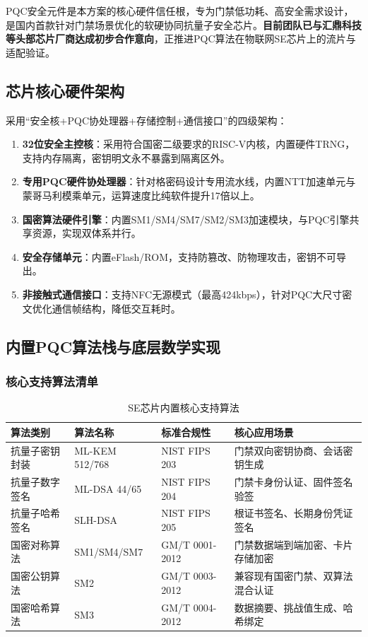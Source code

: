 PQC安全元件是本方案的核心硬件信任根，专为门禁低功耗、高安全需求设计，是国内首款针对门禁场景优化的软硬协同抗量子安全芯片。\textbf{目前团队已与汇鼎科技等头部芯片厂商达成初步合作意向}，正推进PQC算法在物联网SE芯片上的流片与适配验证。

\subsection{芯片核心硬件架构}

采用“安全核+PQC协处理器+存储控制+通信接口”的四级架构：
\begin{enumerate}
	\item \textbf{32位安全主控核}：采用符合国密二级要求的RISC-V内核，内置硬件TRNG，支持内存隔离，密钥明文永不暴露到隔离区外。
	\item \textbf{专用PQC硬件协处理器}：针对格密码设计专用流水线，内置NTT加速单元与蒙哥马利模乘单元，运算速度比纯软件提升17倍以上。
	\item \textbf{国密算法硬件引擎}：内置SM1/SM4/SM7/SM2/SM3加速模块，与PQC引擎共享资源，实现双体系并行。
	\item \textbf{安全存储单元}：内置eFlash/ROM，支持防篡改、防物理攻击，密钥不可导出。
	\item \textbf{非接触式通信接口}：支持NFC无源模式（最高424kbps），针对PQC大尺寸密文优化通信帧结构，降低交互耗时。
\end{enumerate}

\subsection{内置PQC算法栈与底层数学实现}

\subsubsection{核心支持算法清单}

\begin{table}[htbp]
	\centering
	\caption{SE芯片内置核心支持算法}
	\renewcommand{\arraystretch}{1.2}
	\begin{tabular}{lllp{5.5cm}}
		\toprule
		\textbf{算法类别} & \textbf{算法名称} & \textbf{标准合规性} & \textbf{核心应用场景} \\
		\midrule
		抗量子密钥封装 & ML-KEM 512/768 & NIST FIPS 203 & 门禁双向密钥协商、会话密钥生成 \\
		抗量子数字签名 & ML-DSA 44/65 & NIST FIPS 204 & 门禁卡身份认证、固件签名验签 \\
		抗量子哈希签名 & SLH-DSA & NIST FIPS 205 & 根证书签名、长期身份凭证签名 \\
		国密对称算法 & SM1/SM4/SM7 & GM/T 0001-2012 & 门禁数据端到端加密、卡片存储加密 \\
		国密公钥算法 & SM2 & GM/T 0003-2012 & 兼容现有国密门禁、双算法混合认证 \\
		国密哈希算法 & SM3 & GM/T 0004-2012 & 数据摘要、挑战值生成、哈希绑定 \\
		\bottomrule
	\end{tabular}
\end{table}

